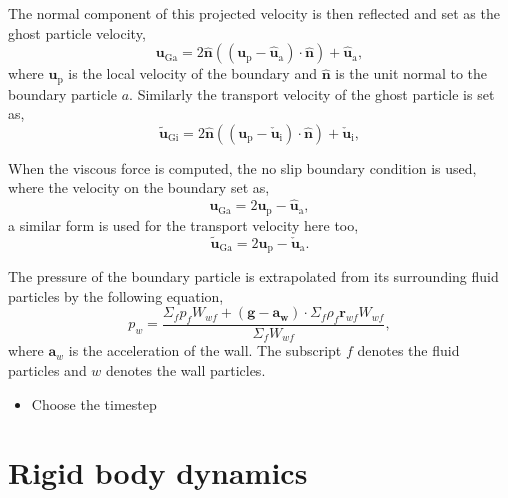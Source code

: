 \documentclass[preprint,12pt]{elsarticle}
\newcommand{\ten}[1]{\ensuremath{\mathbf{#1}}}
\begin{document}
The normal component of this projected velocity is then reflected and set as
the ghost particle velocity,
\begin{equation}
  \label{eq:free-slip-bc-u}
  \ten{u}_{\text{Ga}} = 2 \ten{\hat{n}}((\ten{u}_{\text{p}} - \ten{\hat{u}}_{\text{a}})\cdot \ten{\hat{n}}) + \ten{\hat{u}}_{\text{a}},
\end{equation}
where $\ten{u}_{\text{p}}$ is the local velocity of the boundary and
$\ten{\hat{n}}$ is the unit normal to the boundary particle $a$. Similarly the
transport velocity of the ghost particle is set as,
\begin{equation}
  \label{eq:free-slip-bc-u}
  \tilde{\ten{u}}_{\text{Gi}} = 2 \ten{\hat{n}}((\ten{u}_{\text{p}} - \ten{\check{u}}_{\text{i}})\cdot \ten{\hat{n}}) + \ten{\check{u}}_{\text{i}},
\end{equation}

When the viscous force is computed, the no slip boundary condition is used,
where the velocity on the boundary set as,
\begin{equation}
  \label{eq:no-slip-bc-u}
  \ten{u}_{\text{Ga}} = 2 \ten{u}_{\text{p}} - \ten{\hat{u}}_{\text{a}},
\end{equation}
a similar form is used for the transport velocity here too,
\begin{equation}
  \label{eq:no-slip-bc-uhat}
  \tilde{\ten{u}}_{\text{Ga}} = 2 \ten{u}_{\text{p}} - \ten{\check{u}}_{\text{a}}.
\end{equation}

The pressure of the boundary particle is extrapolated from its surrounding
fluid particles by the following equation,
\begin{equation}
  \label{eq:pressure-bc}
  p_w = \frac{\Sigma_f p_f W_{wf} + (\ten{g} - \ten{a}_{\ten{w}}) \cdot \Sigma_f
    \rho_f \ten{r}_{wf} W_{wf}}{\Sigma_f W_{wf}},
\end{equation}
where $\ten{a}_w$ is the acceleration of the wall. The subscript $f$ denotes
the fluid particles and $w$ denotes the wall particles.


\begin{itemize}
\item Choose the timestep
\end{itemize}


\FloatBarrier%
\section{Rigid body dynamics}
\label{sec:rbd}
\end{document}
